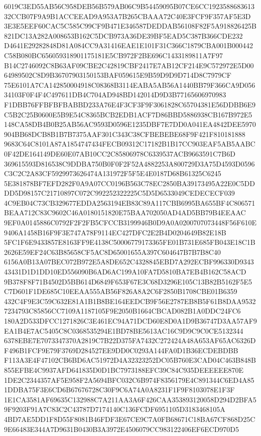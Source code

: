 \documentclass[UTF8,fontset=fandol,zihao=-4,a4paper]{ctexart}
\begin{document}
{{6019C3ED55AB56C958DEB56B579AB06C9B54459095B07CE6CC192358868361332CCB07F9A9B1ACCEEAD9A953A7B265CBAAA72C40E3FCF9F357AF5E3D
3E3E5EEF60CAC5C585C99CF9B471E346587DEDDAB56108F82F5A918826425B821DC13A282A008653B162C5DCB973A36DE39BF5EAD5C387B366CDE232
D4641E29282848D81A084CC9A31416EAE1E101F31C366C1879CBA001B000442C58B080BC656059318901175181E5CB972F2BE696C1433189811A7F97
B14C2746092C8B63AF09CBE2C42819CBF2417E7AB12CF214E9C572972E5D0064989502C8D9B36707903150153BAF059615E9B59D9D9D714D8C7979CF
75E6101A7CA142850004918C08368B3114EABA5AB56A1440BB79F366CA9D05634103F0F4F4C497611DB4C704AD948BD142014D9D3B77165606970983
F1DBB76FFBFBFBABBD233A76E4F3CF3F9F3061828C65704381E56DDBB6E9C5B2C25B0600E5B9E54C8365BCB2EDB1ACF7D86BBD5886938CB167B972E5
148CA58DB4B0B25AB56AC9593D0596E1235DBF7E7DD0A041EA4842DEE5970904BB68DCB8B1B7B7375AAF301C343C38CFBEBEBE68F9F421F810181888
9683C64C8101A87A1854747434FECB09312C17182B1B17CC903EAF5AB5AABC0F42DE164149DE60E07AB10CC2C85806978C6339537ACB9663591C7B6D
369615593D816538C9DDBA750B0F0F2F52A4882253A800729D3A75D4593D0596C3C2C2A83CF5929973626474A131972F5F5E4E0187D68B61325C6245
5E381878BF7EFD282F0A9A07CC0196B563C78EC2850BA39173495A22E0C5DDDD5D98157C21710897C072C992252322225C5D5D6533049CEDECECF039
4C9EB04C73CB329677EDDA2563194EB83C89A117CBB6995BA655BF4C806571BEAA712C83C9602C46A0180151820E75BAA702050AD4AD5BB79B4EEAAC
9EF0A0145886C0792F2F2FB5CFCCB3199946B0D9A0A0200707073448F56F610E9406A1458B16F9F3E747A78F9114EC427DFC2E2B4D0204649B82E18B
5FC1F6E9433857E8163FF9E4138C50006779173365FE01B731E685FB043E18C1B2626E59EF24C63B85658CF5AC8D65001655A397C604647B7B7B8C40
6156A0B13A07BEC072B972E5A8DE652C4328845EBD7A292ECBF996330D934343431D1D1DD10ED556090B6AD6AC199A10FA7D5810BA7EB4B162C58ACD
9B378F8F71B4502D5BB614D6849F653F67E3C68D3296E105C13B82B5162F5E5C7D601F1DE685C10EEAA555AB56F826A8A2C6F2850B1708CBE01B6359
432C4F9E3C59C632E81A1B1B8BE164EEDCB9F56E2787EB8B5F61B8DAA95327234793C85856CC7109A1187105F9E2050B1664CBCAD082B1A0DDC24FC6
180A2D533DFCC1271826C3E461EC94A71DCD60E8D0A1D9B36747D3AA57AF9EA1B4E7AC5405C8C0368535294E1BD78BE5613AC16C9D9C9C0CE5132344
6378EBE7E7073347370A2819C7B22D375FA7432C272424A48A653AF65AC6326DF496B1FCF9E79F3769D284527EE9DD0C0293A144FA0D1B36ECDEBDBB
F113A3E4F47102CB6BD6AC51972D4A32323252DC05B760E3CAD04C463B848B855EFBE4C9937AFD641835D0D1BC7973188EFC39C84C935DEEEEEE870E
1DE2C2344357AF5E958F2A5694BFC032C6B974F8356179E4C891344C6ED4A851DDBA75F3E6CD6B67676728C30F9C6A74A0A8231F1F9F8103078E1F3F
1E1CA3581AF69635C132988C7A211AA3A6F426CAA353893120058D294D2BFA59F9203F91A7C83C2C43787D7174140C136FCDF6951105D3183468105A
4BD7AE5DD1F8D55F8081B46FDF3E67CE9C7A0FB68671C18BA67CF868D25C9E66483E344A7D9631B0430B3A3972E4506079CC983122406EF6ECD970D5
}}
\end{document}
